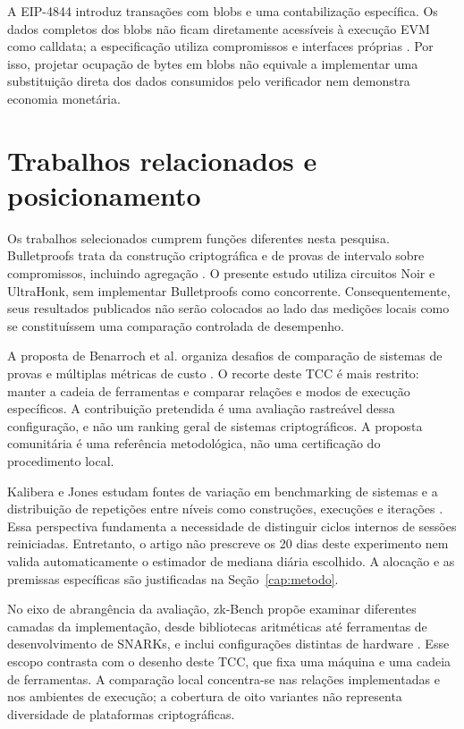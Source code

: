 A EIP-4844 introduz transações com blobs e uma contabilização específica. Os dados completos dos blobs não ficam diretamente acessíveis à execução EVM como calldata; a especificação utiliza compromissos e interfaces próprias \cite{eip4844}. Por isso, projetar ocupação de bytes em blobs não equivale a implementar uma substituição direta dos dados consumidos pelo verificador nem demonstra economia monetária.

\section{Trabalhos relacionados e posicionamento}

Os trabalhos selecionados cumprem funções diferentes nesta pesquisa. Bulletproofs trata da construção criptográfica e de provas de intervalo sobre compromissos, incluindo agregação \cite{bulletproofs}. O presente estudo utiliza circuitos Noir e UltraHonk, sem implementar Bulletproofs como concorrente. Consequentemente, seus resultados publicados não serão colocados ao lado das medições locais como se constituíssem uma comparação controlada de desempenho.

A proposta de Benarroch et al. organiza desafios de comparação de sistemas de provas e múltiplas métricas de custo \cite{zkbenchmark}. O recorte deste TCC é mais restrito: manter a cadeia de ferramentas e comparar relações e modos de execução específicos. A contribuição pretendida é uma avaliação rastreável dessa configuração, e não um ranking geral de sistemas criptográficos. A proposta comunitária é uma referência metodológica, não uma certificação do procedimento local.

Kalibera e Jones estudam fontes de variação em benchmarking de sistemas e a distribuição de repetições entre níveis como construções, execuções e iterações \cite{kalibera}. Essa perspectiva fundamenta a necessidade de distinguir ciclos internos de sessões reiniciadas. Entretanto, o artigo não prescreve os 20 dias deste experimento nem valida automaticamente o estimador de mediana diária escolhido. A alocação e as premissas específicas são justificadas na Seção~\ref{cap:metodo}.

No eixo de abrangência da avaliação, zk-Bench propõe examinar diferentes camadas da implementação, desde bibliotecas aritméticas até ferramentas de desenvolvimento de SNARKs, e inclui configurações distintas de hardware \cite{zkbench}. Esse escopo contrasta com o desenho deste TCC, que fixa uma máquina e uma cadeia de ferramentas. A comparação local concentra-se nas relações implementadas e nos ambientes de execução; a cobertura de oito variantes não representa diversidade de plataformas criptográficas.

